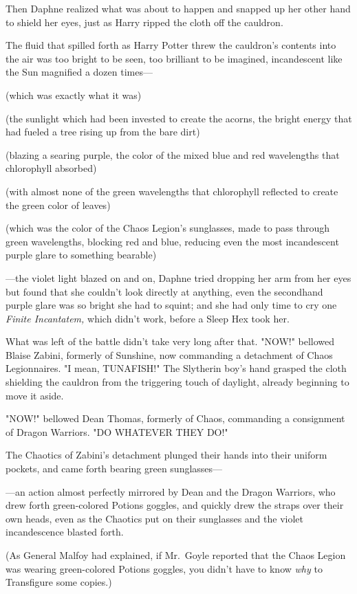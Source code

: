 Then Daphne realized what was about to happen and snapped up her other hand to 
shield her eyes, just as Harry ripped the cloth off the cauldron.

The fluid that spilled forth as Harry Potter threw the cauldron's contents into 
the air was too bright to be seen, too brilliant to be imagined, incandescent 
like the Sun magnified a dozen times---

(which was exactly what it was)

(the sunlight which had been invested to create the acorns, the bright energy 
that had fueled a tree rising up from the bare dirt)

(blazing a searing purple, the color of the mixed blue and red wavelengths that 
chlorophyll absorbed)

(with almost none of the green wavelengths that chlorophyll reflected to create 
the green color of leaves)

(which was the color of the Chaos Legion's sunglasses, made to pass through 
green wavelengths, blocking red and blue, reducing even the most incandescent 
purple glare to something bearable)

---the violet light blazed on and on, Daphne tried dropping her arm from her 
eyes but found that she couldn't look directly at anything, even the secondhand 
purple glare was so bright she had to squint; and she had only time to cry one 
\emph{Finite Incantatem,} which didn't work, before a Sleep Hex took her.

What was left of the battle didn't take very long after that.
\sbreak
"NOW!" bellowed Blaise Zabini, formerly of Sunshine, now commanding a 
detachment of Chaos Legionnaires. "I mean, TUNAFISH!" The Slytherin boy's hand 
grasped the cloth shielding the cauldron from the triggering touch of daylight, 
already beginning to move it aside.

"NOW!" bellowed Dean Thomas, formerly of Chaos, commanding a consignment of 
Dragon Warriors. "DO WHATEVER THEY DO!"

The Chaotics of Zabini's detachment plunged their hands into their uniform 
pockets, and came forth bearing green sunglasses---

---an action almost perfectly mirrored by Dean and the Dragon Warriors, who 
drew forth green-colored Potions goggles, and quickly drew the straps over 
their own heads, even as the Chaotics put on their sunglasses and the violet 
incandescence blasted forth.

(As General Malfoy had explained, if Mr.~Goyle reported that the Chaos Legion 
was wearing green-colored Potions goggles, you didn't have to know \emph{why} 
to Transfigure some copies.)

